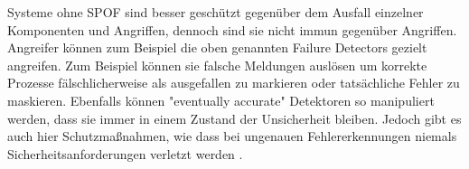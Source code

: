 \documentclass[a4paper,12pt]{article}
\begin{document}
Systeme ohne SPOF sind besser geschützt gegenüber dem Ausfall einzelner Komponenten und Angriffen, dennoch sind sie nicht immun gegenüber Angriffen. Angreifer können zum Beispiel die oben genannten Failure Detectors gezielt angreifen. Zum Beispiel können sie falsche Meldungen auslösen um korrekte Prozesse fälschlicherweise als ausgefallen zu markieren oder tatsächliche Fehler zu maskieren. Ebenfalls können "eventually accurate" Detektoren so manipuliert werden, dass sie immer in einem Zustand der Unsicherheit bleiben. Jedoch gibt es auch hier Schutzmaßnahmen, wie dass bei ungenauen Fehlererkennungen niemals Sicherheitsanforderungen verletzt werden \cite{10.1145/1052796.1052806}.


\end{document}
